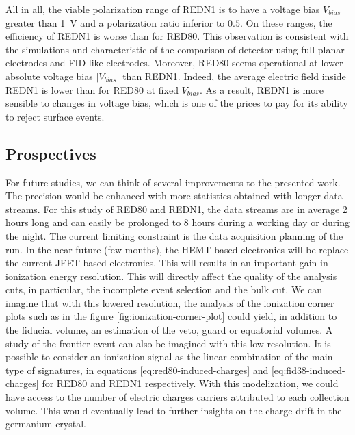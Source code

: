 All in all, the viable polarization range of REDN1 is to have a voltage bias $V_{bias}$ greater than \SI{1}{\volt} and a polarization ratio inferior to $0.5$. On these ranges, the efficiency of REDN1 is worse than for RED80. This observation is consistent with the simulations and characteristic of the comparison of detector using full planar electrodes and FID-like electrodes. Moreover, RED80 seems operational at lower absolute voltage bias $| V_{bias} |$ than REDN1. Indeed, the average electric field inside REDN1 is lower than for RED80 at fixed $V_{bias}$. As a result, REDN1 is more sensible to changes in voltage bias, which is one of the prices to pay for its ability to reject surface events.


\subsection{Prospectives}

For future studies, we can think of several improvements to the presented work.
The precision would be enhanced with more statistics obtained with longer data streams. For this study of RED80 and REDN1, the data streams are in average 2 hours long and can easily be prolonged to 8 hours during a working day or during the night. The current limiting constraint is the data acquisition planning of the run.
In the near future (few months), the HEMT-based electronics will be replace the current JFET-based electronics. This will results in an important gain in ionization energy resolution. This will directly affect the quality of the analysis cuts, in particular, the incomplete event selection and the bulk cut.
We can imagine that with this lowered resolution, the analysis of the ionization corner plots such as in the figure \ref{fig:ionization-corner-plot} could yield, in addition to the fiducial volume, an estimation of the veto, guard or equatorial volumes.
A study of the frontier event can also be imagined with this low resolution. It is possible to consider an ionization signal as the linear combination of the main type of signatures, in equations \ref{eq:red80-induced-charges} and \ref{eq:fid38-induced-charges} for RED80 and REDN1 respectively. With this modelization, we could have access to the number of electric charges carriers attributed to each collection volume. This would eventually lead to further insights on the charge drift in the germanium crystal.
